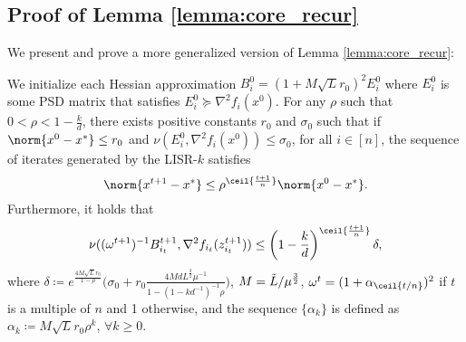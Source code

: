 \subsection{Proof of Lemma \ref{lemma:core_recur}}\label{appendix:core_recur}
We present and prove a more generalized version of Lemma \ref{lemma:core_recur}:
\begin{lemma}
    We initialize each Hessian approximation $B_i^0 = (1 + M \sqrt{L} r_0)^2 E_i^0$ where $E_i^0$ is some PSD matrix that satisfies $E_i^0 \succeq \nabla^2 f_i(x^0)$. 
    For any $\rho$ such that $0 < \rho < 1 - \frac{k}{d}$, there exists positive constants $r_0$ and $\sigma_0$ such that if $\norm{x^0 - x^*} \leq r_0$ and $\nu(E_i^0, \nabla^2 f_i (x^0)) \leq \sigma_0$, for all $i \in [n]$, the sequence of iterates generated by the LISR-$k$ satisfies
    \begin{equation}
        \norm{x^{t+1} - x^*} \leq \rho^{\ceil{\frac{t+1}{n}}} \norm{x^0 - x^*}.
        \label{eq:sr_residual_recur_1}
    \end{equation}
    Furthermore, it holds that
    \begin{equation}
         \nu((\omega^{t+1})^{-1} B_{i_t}^{t+1}, \nabla^2 f_{i_t}(z_{i_t}^{t+1})) \leq \left(1 - \frac{k}{d} \right)^{\ceil{\frac{t+1}{n}}} \delta,
        \label{eq:sr_hessian_recur_2}
    \end{equation}
    where $\delta \coloneqq e^{\frac{4M \sqrt{L} r_0}{1 - \rho}}\big(\sigma_0 + r_0 \frac{4M d L^{\frac{3}{2}} \mu^{-1}}{1 - (1- k d^{-1})^{-1} \rho}\big)$, $M = \Tilde{L} / \mu^{\frac{3}{2}}$, $\omega^t = (1 + \alpha_{\ceil{t/n}})^2$  if $t$ is a multiple of $n$ and 1 otherwise, and the sequence $\{ \alpha_k\}$ is defined as $\alpha_k \coloneqq M \sqrt{L} r_0 \rho^k$, $\forall k \geq 0$.
    \label{lemma:srk_core_recur}
\end{lemma}


